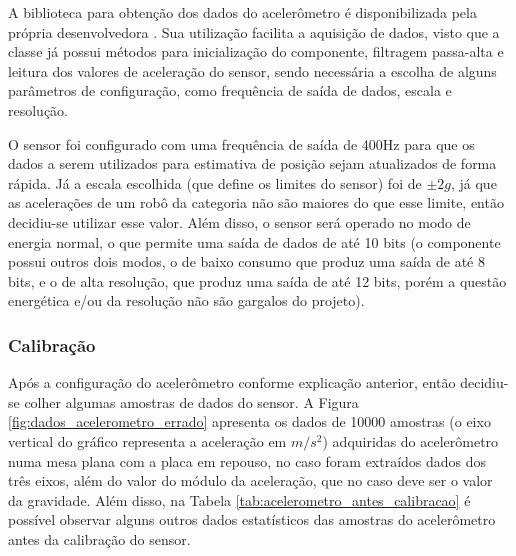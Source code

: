 \documentclass[acronym, symbols, table]{fei}
\begin{document}
	A biblioteca para obtenção dos dados do acelerômetro é disponibilizada pela própria desenvolvedora \cite{accelero_repository}. Sua utilização facilita a aquisição de dados, visto que a classe já possui métodos para inicialização do componente, filtragem passa-alta e leitura dos valores de aceleração do sensor, sendo necessária a escolha de alguns parâmetros de configuração, como frequência de saída de dados, escala e resolução.
	
	O sensor foi configurado com uma frequência de saída de 400Hz para que os dados a serem utilizados para estimativa de posição sejam atualizados de forma rápida. Já a escala escolhida (que define os limites do sensor) foi de $\pm2g$, já que as acelerações de um robô da categoria  não são maiores do que esse limite, então decidiu-se utilizar esse valor. Além disso, o sensor será operado no modo de energia normal, o que permite uma saída de dados de até 10 bits (o componente possui outros dois modos, o de baixo consumo que produz uma saída de até 8 bits, e o de alta resolução, que produz uma saída de até 12 bits, porém a questão energética e/ou da resolução não são gargalos do projeto).
	
	\subsubsection{Calibração}
	
	Após a configuração do acelerômetro conforme explicação anterior, então decidiu-se colher algumas amostras de dados do sensor. A Figura \ref{fig:dados_acelerometro_errado} apresenta os dados de 10000 amostras (o eixo vertical do gráfico representa a aceleração em $m/s^2$) adquiridas do acelerômetro numa mesa plana com a placa em repouso, no caso foram extraídos dados dos três eixos, além do valor do módulo da aceleração, que no caso deve ser o valor da gravidade. Além disso, na Tabela \ref{tab:acelerometro_antes_calibracao} é possível observar alguns outros dados estatísticos das amostras do acelerômetro antes da calibração do sensor.
	
\end{document}

